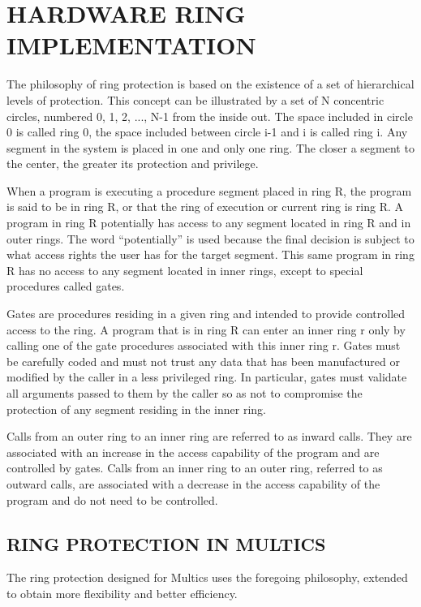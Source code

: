 
\section{HARDWARE RING IMPLEMENTATION}

The philosophy of ring protection is based on the existence of a set of
hierarchical levels of protection. This concept can be illustrated by a set of
N concentric circles, numbered 0, 1, 2, ..., N-1 from the inside out. The space
included in circle 0 is called ring 0, the space included between circle i-1
and i is called ring i. Any segment in the system is placed in one and only one
ring. The closer a segment to the center, the greater its protection and
privilege.  

When a program is executing a procedure segment placed in ring R, the program
is said to be in ring R, or that the ring of execution or current ring is ring
R. A program in ring R potentially has access to any segment located in ring R
and in outer rings. The word {``}potentially'' is used because the final
decision is subject to what access rights the user has for the target segment.
This same program in ring R has no access to any segment located in inner
rings, except to special procedures called gates.


Gates are procedures residing in a given ring and intended to provide
controlled access to the ring. A program that is in ring R can enter an inner
ring r only by calling one of the gate procedures associated with this inner
ring r. Gates must be carefully coded and must not trust any data that has been
manufactured or modified by the caller in a less privileged ring. In
particular, gates must validate all arguments passed to them by the caller so
as not to compromise the protection of any segment residing in the inner ring.

Calls from an outer ring to an inner ring are referred to as inward calls. They
are associated with an increase in the access capability of the program and are
controlled by gates.  Calls from an inner ring to an outer ring, referred to as
outward calls, are associated with a decrease in the access capability of the
program and do not need to be controlled.  

\subsection{RING PROTECTION IN MULTICS}

The ring protection designed for Multics uses the foregoing philosophy,
extended to obtain more flexibility and better efficiency.

